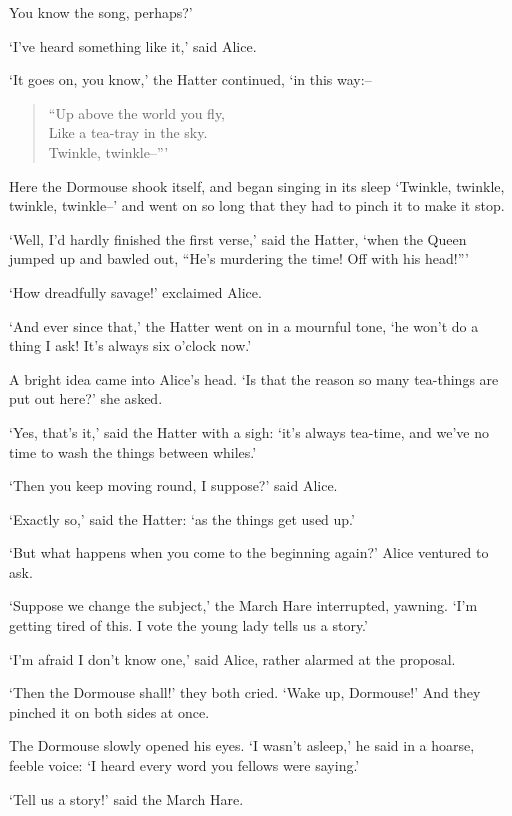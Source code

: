 \documentclass[12pt]{book}
\begin{document}
You know the song, perhaps?'

  `I've heard something like it,' said Alice.

  `It goes on, you know,' the Hatter continued, `in this way:--

\begin{verse}
            ``Up above the world you fly,\\
            Like a tea-tray in the sky.\\
                    Twinkle, twinkle--'''
\end{verse}

Here the Dormouse shook itself, and began singing in its sleep
`Twinkle, twinkle, twinkle, twinkle--' and went on so long that
they had to pinch it to make it stop.

  `Well, I'd hardly finished the first verse,' said the Hatter,
`when the Queen jumped up and bawled out, ``He's murdering the
time!  Off with his head!'''

  `How dreadfully savage!' exclaimed Alice.

  `And ever since that,' the Hatter went on in a mournful tone,
`he won't do a thing I ask!  It's always six o'clock now.'

  A bright idea came into Alice's head.  `Is that the reason so
many tea-things are put out here?' she asked.

  `Yes, that's it,' said the Hatter with a sigh:  `it's always
tea-time, and we've no time to wash the things between whiles.'

  `Then you keep moving round, I suppose?' said Alice.

  `Exactly so,' said the Hatter:  `as the things get used up.'

  `But what happens when you come to the beginning again?' Alice
ventured to ask.

  `Suppose we change the subject,' the March Hare interrupted,
yawning.  `I'm getting tired of this.  I vote the young lady
tells us a story.'

  `I'm afraid I don't know one,' said Alice, rather alarmed at
the proposal.

  `Then the Dormouse shall!' they both cried.  `Wake up,
Dormouse!'  And they pinched it on both sides at once.

  The Dormouse slowly opened his eyes.  `I wasn't asleep,' he
said in a hoarse, feeble voice:  `I heard every word you fellows
were saying.'

  `Tell us a story!' said the March Hare.
\end{document}
